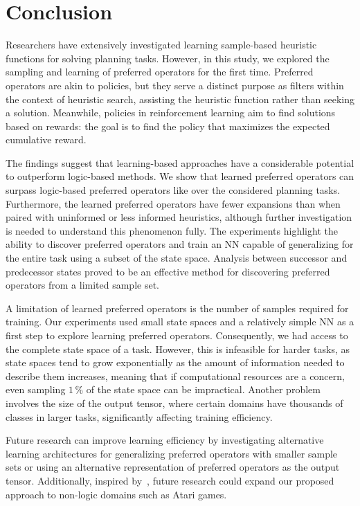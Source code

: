 \documentclass[ppgc,diss,english]{iiufrgs}
\begin{document}
\chapter{Conclusion}
\label{cha:conclusion}
Researchers have extensively investigated learning sample-based heuristic functions for solving planning tasks.
However, in this study, we explored the sampling and learning of preferred operators for the first time.
Preferred operators are akin to policies, but they serve a distinct purpose as filters within the context of heuristic search, assisting the heuristic function rather than seeking a solution. Meanwhile, policies in reinforcement learning aim to find solutions based on rewards: the goal is to find the policy that maximizes the expected cumulative reward.

The findings suggest that learning-based approaches have a considerable potential to outperform logic-based methods. We show that learned preferred operators can surpass logic-based preferred operators like \poff over the considered planning tasks. Furthermore, the learned preferred operators have fewer expansions than \poff when paired with uninformed or less informed heuristics, although further investigation is needed to understand this phenomenon fully.
The experiments highlight the ability to discover preferred operators and train an NN capable of generalizing for the entire task using a subset of the state space. Analysis between successor and predecessor states proved to be an effective method for discovering preferred operators from a limited sample set.

A limitation of learned preferred operators is the number of samples required for training. Our experiments used small state spaces and a relatively simple NN as a first step to explore learning preferred operators. Consequently, we had access to the complete state space of a task. However, this is infeasible for harder tasks, as state spaces tend to grow exponentially as the amount of information needed to describe them increases, meaning that if computational resources are a concern, even sampling $1\,\%$ of the state space can be impractical. Another problem involves the size of the output tensor, where certain domains have thousands of classes in larger tasks, significantly affecting training efficiency.

Future research can improve learning efficiency by investigating alternative learning architectures for generalizing preferred operators with smaller sample sets or using an alternative representation of preferred operators as the output tensor. Additionally, inspired by~\citet{Lipovetzky/2015}, future research could expand our proposed approach to non-logic domains such as Atari games.
\end{document}
